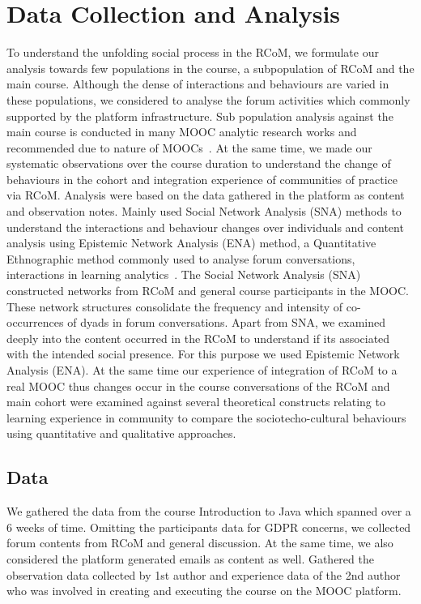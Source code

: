 \documentclass[format=acmsmall, review=false, screen=true]{acmart}
\begin{document}
\section{Data Collection and Analysis}
To understand the unfolding social process in the RCoM, we formulate our analysis towards few populations in the course, a subpopulation of RCoM and the main course. Although the dense of interactions and behaviours are varied in these populations, we considered to analyse the forum activities which commonly supported by the platform infrastructure. Sub population analysis against the main course is conducted in many MOOC analytic research works and recommended due to nature of MOOCs~\cite{dowell2015modeling, joksimovic2015social, poquet2018social, oleksandra2016untangling}. At the same time, we made our systematic observations over the course duration to understand the change of behaviours in the cohort and integration experience of communities of practice via RCoM. Analysis were based on the data gathered in the platform as content and observation notes. Mainly used Social Network Analysis (SNA) methods to understand the interactions and behaviour changes over individuals and content analysis using Epistemic Network Analysis (ENA) method, a Quantitative Ethnographic method commonly used to analyse forum conversations, interactions in learning analytics~\cite{shaffer2009epistemic}. The Social Network Analysis (SNA) constructed networks from RCoM and general course participants in the MOOC. These network structures consolidate the frequency and intensity of co-occurrences of dyads in forum conversations. Apart from SNA, we examined deeply into the content occurred in the RCoM to understand if its associated with the intended social presence. For this purpose we used Epistemic Network Analysis (ENA). At the same time our experience of integration of RCoM to a real MOOC thus changes occur in the course conversations of the RCoM and main cohort were examined against several theoretical constructs relating to learning experience in community to compare the sociotecho-cultural behaviours using quantitative and qualitative approaches. 

\subsection{Data}
We gathered the data from the course Introduction to Java which spanned over a 6 weeks of time. Omitting the participants data for GDPR concerns, we collected forum contents from RCoM and general discussion. At the same time, we also considered the platform generated emails as content as well. Gathered the observation data collected by 1st author and experience data of the 2nd author who was involved in creating and executing the course on the MOOC platform. 
\end{document}
